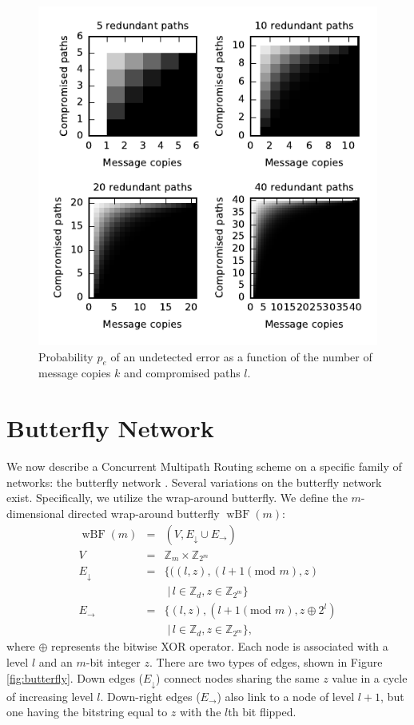 \documentclass[twocolumn]{article}
\newcommand{\beq}{\begin{eqnarray}}
\newcommand{\eeq}{\end{eqnarray}}
\DeclareMathOperator{\wbf}{wBF}
\begin{document}
\begin{figure}
\includegraphics{fig-perror.pdf}
\caption{
Probability $p_e$ of an undetected error as a function of the number of message
copies $k$ and compromised paths $l$.
\label{fig:perror}
}
\end{figure}

\section{Butterfly Network}

We now describe a Concurrent Multipath Routing scheme on a specific family
of networks: the butterfly network \cite{}.
Several variations on the butterfly network exist.
Specifically, we utilize the wrap-around butterfly.
We define the $m$-dimensional directed wrap-around butterfly $\wbf(m)$:
\beq
\wbf(m) &=& (V, E_\downarrow \cup E_\rightarrow) \\
V &=& \mathbb{Z}_m \times \mathbb{Z}_{2^m} \\
E_\downarrow &=& \{((l,z),(l+1 (\text{mod } m),z) \nonumber \\
&& \; | \, l \in \mathbb{Z}_d, z \in \mathbb{Z}_{2^m}\} \\
E_\rightarrow &=& \{(l,z),(l+1 (\text{mod } m), z \oplus 2^l) \nonumber \\
&& \; | \, l \in \mathbb{Z}_d, z \in \mathbb{Z}_{2^m}\},
\eeq
where $\oplus$ represents the bitwise XOR operator.
Each node is associated with a level $l$ and an $m$-bit integer $z$.
There are two types of edges, shown in Figure \ref{fig:butterfly}.
Down edges ($E_\downarrow$) connect nodes sharing the same $z$ value
in a cycle of increasing level $l$.
Down-right edges ($E_\rightarrow$) also link to a node of level $l + 1$,
but one having the bitstring equal to $z$ with the $l$th bit flipped.
\end{document}
